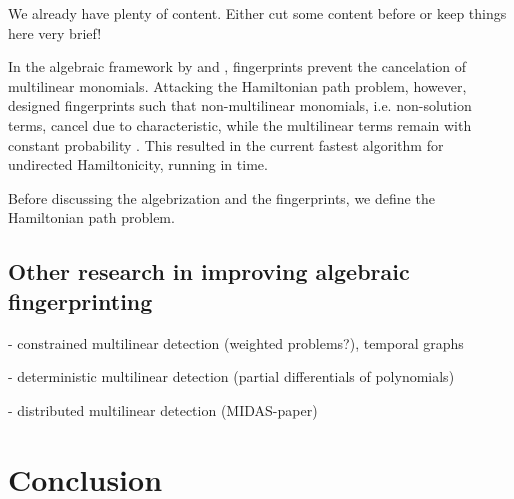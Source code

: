 \begin{anamnote}[nomargin]{}
  We already have plenty of content.
  Either cut some content before or keep things here very brief!
\end{anamnote}

In the algebraic framework by \citeauthor{Koutis08} and \citeauthor{Williams09}, 
fingerprints prevent the cancelation of multilinear monomials. 
Attacking the Hamiltonian path problem, however, \citeauthor{Björklund14} 
designed fingerprints such that non-multilinear monomials, i.e. non-solution terms, 
cancel due to characteristic, while the multilinear terms 
remain with constant probability \cite{Björklund14}. This resulted in the current 
fastest algorithm for undirected Hamiltonicity, running in  time.

Before discussing the algebrization and the fingerprints, 
we define the Hamiltonian path problem.

\begin{problem}
\end{problem}


\subsection{Other research in improving algebraic fingerprinting}
\label{sect:other_improvements}

- constrained multilinear detection (weighted problems?), temporal graphs

- deterministic multilinear detection (partial differentials of polynomials)

- distributed multilinear detection (MIDAS-paper)

\section{Conclusion}
\label{sect:conclusion}

